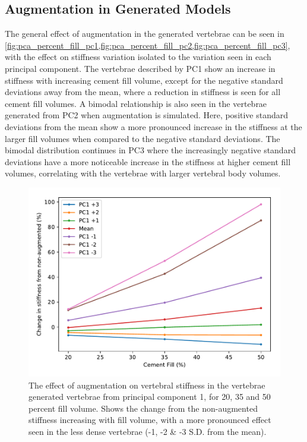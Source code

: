\subsection{Augmentation in Generated Models}


The general effect of augmentation in the generated vertebrae can be seen in
\cref{fig:pca_percent_fill_pc1,fig:pca_percent_fill_pc2,fig:pca_percent_fill_pc3},
with the effect on stiffness variation isolated to the variation seen in each
principal component.  The vertebrae described by PC1 show an increase in
stiffness with increasing cement fill volume, except for the negative standard
deviations away from the mean, where a reduction in stiffness is seen for all
cement fill volumes.  A bimodal relationship is also seen in the vertebrae
generated from PC2 when augmentation is simulated.  Here, positive standard
deviations from the mean show a more pronounced increase in the stiffness at
the larger fill volumes when compared to the negative standard deviations.  The
bimodal distribution continues in PC3 where the increasingly negative standard
deviations have a more noticeable increase in the stiffness at higher cement
fill volumes, correlating with the vertebrae with larger vertebral body
volumes.

\begin{figure}[h]
  \centering
  \includegraphics[width=.9\textwidth]{Chapters/Chapter_PCA_images/pca_percent_fill_pc1.pdf}
  \caption[Effect of augmentation in principal component 1.]{The effect of
	augmentation on vertebral stiffness in the vertebrae generated
	vertebrae from principal component 1, for 20, 35 and 50 percent fill
	volume. Shows the change from the non-augmented stiffness increasing
	with fill volume, with a more pronounced effect seen in the less dense
	vertebrae (-1, -2 \& -3 S.D. from the mean).}
  \label{fig:pca_percent_fill_pc1}
\end{figure}

